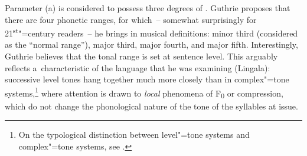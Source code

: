 Parameter (a) is considered to possess three degrees of . Guthrie proposes that there are four phonetic ranges, for which~-- somewhat surprisingly for 21\textsuperscript{st}"=century readers~-- he brings in musical definitions: minor third (considered as the “normal range''), major third, major fourth, and major fifth. Interestingly, Guthrie believes that the tonal range is set at sentence level. This arguably reflects a~characteristic of the language that he was examining (Lingala): successive level tones hang together much more closely than in complex"=tone systems,\footnote{On the typological distinction between level"=tone systems and complex"=tone systems, see .} where attention is drawn to \textit{local} phenomena of F\textsubscript{0}  or compression, which do not change the phonological nature of the tone of the syllables at issue. 

